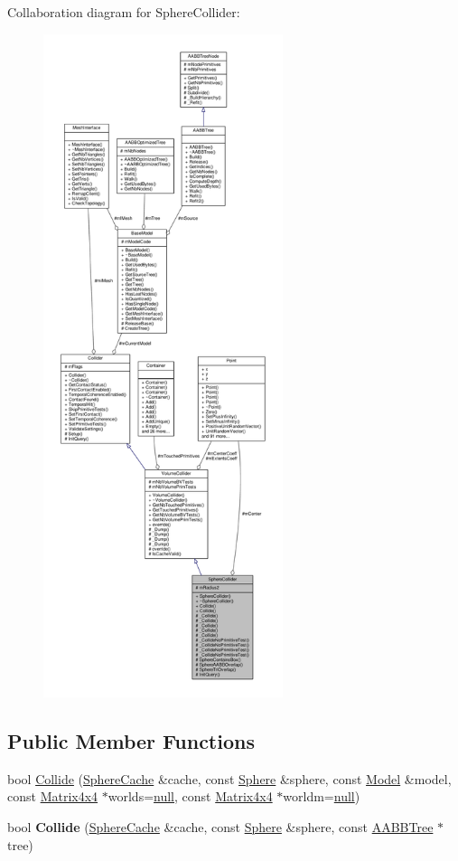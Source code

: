 Collaboration diagram for Sphere\+Collider\+:
\nopagebreak
\begin{figure}[H]
\begin{center}
\leavevmode
\includegraphics[height=550pt]{dc/d92/classSphereCollider__coll__graph}
\end{center}
\end{figure}
\subsection*{Public Member Functions}
\begin{DoxyCompactItemize}
\item 
bool \hyperlink{classSphereCollider_ad5c6c1a0fb1ea0377b5d6a89a8b5c54b}{Collide} (\hyperlink{structSphereCache}{Sphere\+Cache} \&cache, const \hyperlink{classSphere}{Sphere} \&sphere, const \hyperlink{classModel}{Model} \&model, const \hyperlink{classMatrix4x4}{Matrix4x4} $\ast$worlds=\hyperlink{IceTypes_8h_ac97b8ee753e4405397a42ad5799b0f9e}{null}, const \hyperlink{classMatrix4x4}{Matrix4x4} $\ast$worldm=\hyperlink{IceTypes_8h_ac97b8ee753e4405397a42ad5799b0f9e}{null})
\item 
bool {\bfseries Collide} (\hyperlink{structSphereCache}{Sphere\+Cache} \&cache, const \hyperlink{classSphere}{Sphere} \&sphere, const \hyperlink{classAABBTree}{A\+A\+B\+B\+Tree} $\ast$tree)\hypertarget{classSphereCollider_a3f0d0ed9663d0c39c75f54b4ed4568ce}{}\label{classSphereCollider_a3f0d0ed9663d0c39c75f54b4ed4568ce}

\end{DoxyCompactItemize}
